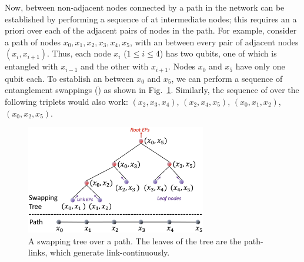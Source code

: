 Now, \eps between non-adjacent nodes connected by a path in the network 
can be established by 
performing a sequence of \ess at 
intermediate nodes; this requires an a priori \eps over 
each of the adjacent pairs of nodes in the path.
For example, consider a path of nodes $x_0, x_1, x_2, x_3, x_4, x_5$, with an \eps 
between every pair of adjacent nodes $(x_i, x_{i+1})$. Thus, each node $x_i$
($1 \leq i \leq 4$) has two qubits, one of which is entangled with $x_{i-1}$ 
and the other with
$x_{i+1}$. Nodes $x_0$ and $x_5$ have only one qubit each.
To establish an \eps 
between $x_0$ and $x_5$, we can perform a sequence of entanglement
swappings (\ess) as shown in Fig.~\ref{fig:swapping_tree}. 
Similarly, the sequence of \es over the following triplets would also 
work: $(x_2, x_3, x_4)$, $(x_2, x_4, x_5)$, $(x_0, x_1, x_2)$, 
$(x_0, x_2, x_5)$. 

\begin{figure}[h]
    \centering
    \includegraphics[width=0.7\textwidth]{chapters/swappingtrees/figures/swapping_tree.jpg}
    \caption{A swapping tree over a path. The leaves of the tree are the path-links, which generate link-\epss continuously.}
\label{fig:swapping_tree}
\end{figure}

